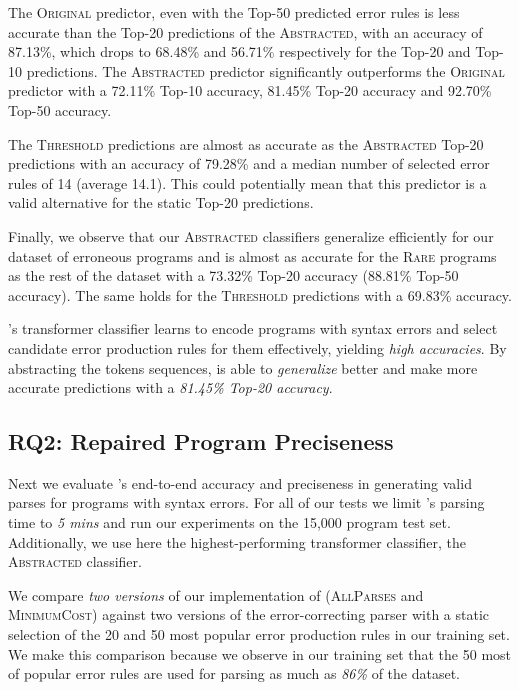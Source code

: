 The \textsc{Original} predictor, even with the Top-50 predicted error rules is
less accurate than the Top-20 predictions of the \textsc{Abstracted}, with an
accuracy of 87.13\%, which drops to 68.48\% and 56.71\% respectively for the
Top-20 and Top-10 predictions. The \textsc{Abstracted} predictor significantly
outperforms the \textsc{Original} predictor with a 72.11\% Top-10 accuracy,
81.45\% Top-20 accuracy and 92.70\% Top-50 accuracy.

The \textsc{Threshold} predictions are almost as accurate as the
\textsc{Abstracted} Top-20 predictions with an accuracy of 79.28\% and a median
number of selected error rules of 14 (average 14.1). This could potentially mean
that this predictor is a valid alternative for the static Top-20 predictions.

Finally, we observe that our \textsc{Abstracted} classifiers generalize
efficiently for our dataset of erroneous \python programs and is almost as
accurate for the \textsc{Rare} programs as the rest of the dataset with a
73.32\% Top-20 accuracy (88.81\% Top-50 accuracy). The same holds for the
\textsc{Threshold} predictions with a 69.83\% accuracy.

\begin{framed}
  \noindent \toolname's transformer classifier learns to encode programs with
  syntax errors and select candidate error production rules for them
  effectively, yielding \emph{high accuracies}. By abstracting the tokens
  sequences, \toolname is able to \emph{generalize} better and make more
  accurate predictions with a \emph{81.45\% Top-20 accuracy}.
\end{framed}


\subsection{RQ2: Repaired Program Preciseness}
\label{sec:eval:precise}

Next we evaluate \toolname's end-to-end accuracy and preciseness in generating
valid parses for programs with syntax errors. For all of our tests we limit
\toolname's parsing time to \emph{5 mins} and run our experiments on the 15,000
program  test set. Additionally, we use here the highest-performing transformer
classifier, the \textsc{Abstracted} classifier.

We compare \emph{two versions} of our implementation of \toolname
(\textsc{AllParses} and \textsc{MinimumCost}) against two versions of the
error-correcting parser with a static selection of the 20 and 50 most popular
error production rules in our training set. We make this comparison because we
observe in our training set that the 50 most of popular error rules are used for
parsing as much as \emph{86\%} of the dataset.

